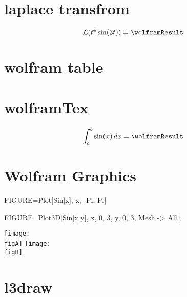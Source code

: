 \documentclass{ztex}
\begin{document}
\def\headrule{
 \vskip-\baselineskip\vskip4pt
 \zdrawSetUnit{\textwidth}
 \zrule[width=.9, height=.001, startColor=blue, endColor=green, step=.1]
}
\section{laplace transfrom}
\lipsum[1]
\[
  \mathcal{L}(t^4\sin(3t)) = \wolframResult
\]


\section{wolfram table}
\lipsum[2]
\begin{center}
\end{center}
\ExplSyntaxOn
\ExplSyntaxOff


\section{wolframTex}
\lipsum[3]
\[
\int_a^b \sin(x)\,dx = \wolframResult
\]

\section{Wolfram Graphics}
\begin{wolframGraphics}
FIGURE=Plot[Sin[x], {x, -Pi, Pi}]
\end{wolframGraphics}
\edef\figA{\wolframOuputFile}

\begin{wolframGraphics}
FIGURE=Plot3D[Sin[x y], {x, 0, 3}, {y, 0, 3}, Mesh -> All];
\end{wolframGraphics}
\edef\figB{\wolframOuputFile}

\lipsum[4]
\begin{center}
\texttt{[image: \\figA]}
\texttt{[image: \\figB]}
\end{center}



\section{l3draw}
\lipsum[5][1-5]
\begin{center}
\end{center} 

\lipsum[5][6-10]
\begin{center}
 \zrule[width=10, startColor=red, step=.1] 
\end{center}
\end{document}
